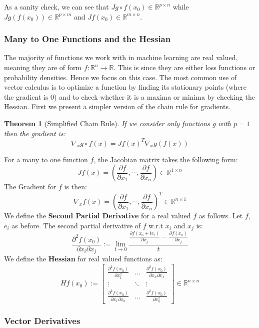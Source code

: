 \documentclass[]{article}
\theoremstyle{mattstyle}
\newtheorem{theorem}{Theorem}[section]
\theoremstyle{definition}
\begin{document}
As a sanity check, we can see that $Jg \circ f(x_0) \in \mathbb{R}^{p \times n}$ while  $Jg(f(x_0))\in \mathbb{R}^{p \times m}$ and $Jf(x_0)\in \mathbb{R}^{m\times n}$.

\subsubsection{Many to One Functions and the Hessian}

The majority of functions we work with in machine learning are real valued, meaning they are of form $f: \mathbb{R}^n \rightarrow \mathbb{R}$. This is since they are either loss functions or probability densities. Hence we focus on this case. The most common use of vector calculus is to optimize a function by finding its stationary points (where the gradient is 0) and to check whether it is a maxima or minima by checking the Hessian. First we present a simpler version of the chain rule for gradients.
\begin{theorem}[Simplified Chain Rule]
If we consider only functions $g$ with $p=1$ then the gradient is: $$\nabla_x g \circ f(x) = Jf(x)^T\nabla_{x}g(f(x))$$
\end{theorem} 
For a many to one function $f$, the Jacobian matrix takes the following form: 
$$J f(x) = \left(\frac{\partial f}{\partial x_1}, \cdots, \frac{\partial f}{\partial x_n}\right) \in \mathbb{R}^{1 \times n}$$
The Gradient for $f$ is then: 
$$\nabla_{x} f(x) = \left(\frac{\partial f}{\partial x_1}, \cdots, \frac{\partial f}{\partial x_n}\right)^T \in \mathbb{R}^{n \times 1}$$
We define the \textbf{Second Partial Derivative} for a real valued $f$ as follows. Let $f$, $e_i$ as before. The second partial derivative of $f$ w.r.t $x_i$ and $x_j$ is:
$$
\frac{\partial^2 f(x_0)}{\partial x_i \partial x_j} := 
\lim\limits_{t \rightarrow 0} \frac{ \frac{\partial f(x_0+te_i)}{\partial x_j} - \frac{\partial f(x_0)}{\partial x_j} }{t}
$$
We define the \textbf{Hessian} for real valued functions as: 
$$H f(x_0) := \begin{bmatrix}
\frac{\partial^2 f(x_0)}{\partial x_1^2} & \dots  & \frac{\partial^2 f(x_0)}{\partial x_n \partial x_1} \\
\vdots & \ddots & \vdots \\
\frac{\partial^2 f(x_0)}{\partial x_1 \partial x_n} & \dots  & \frac{\partial^2 f(x_0)}{\partial x_n^2}
\end{bmatrix}\in \mathbb{R}^{n \times n}$$

\newpage

\subsubsection{Vector Derivatives}
\end{document}
